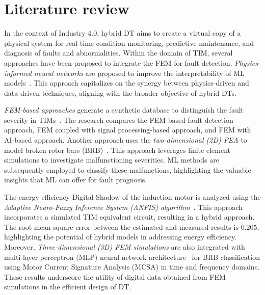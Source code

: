 \documentclass[a4paper,conference]{IEEEtran}
\begin{document}
\section{Literature review}
In the context of Industry 4.0, hybrid DT aims to create a virtual copy of a physical system for real-time condition monitoring, predictive maintenance, and diagnosis of faults and abnormalities. Within the domain of TIM, several approaches have been proposed to integrate the FEM for fault detection. \textit{Physics-informed neural networks} are proposed to improve the interpretability of ML models~\cite{9646258}. This approach capitalizes on the synergy between physics-driven and data-driven techniques, aligning with the broader objective of hybrid DTs.

\textit{FEM-based approaches} generate a synthetic database to distinguish the fault severity in TIMs~\cite{8930293}. The research compares the FEM-based fault detection approach, FEM coupled with signal processing-based approach, and FEM with AI-based approach.  Another approach uses the \textit{two-dimensional (2D) FEA} to model broken rotor bars (BRB)~\cite{8369981}. This approach leverages finite element simulations to investigate malfunctioning severities. ML methods are subsequently employed to classify these malfunctions, highlighting the valuable insights that ML can offer for fault prognosis. 

The energy efficiency Digital Shadow of the induction motor is analyzed using the \textit{Adaptive Neuro-Fuzzy Inference System (ANFIS) algorithm}~\cite{AMADOUADAMOU2023101469}. This approach incorporates a simulated TIM equivalent circuit, resulting in a hybrid approach. The root-mean-square error between the estimated and measured results is $0.205$, highlighting the potential of hybrid models in addressing energy efficiency. Moreover, \textit{Three-dimensional (3D) FEM simulations} are also integrated with multi-layer perceptron (MLP) neural network architecture~\cite{s21237833} for BRB classification using Motor Current Signature Analysis (MCSA) in time and frequency domains. These results underscore the utility of digital data obtained from FEM simulations in the efficient design of DT. 
\end{document}
